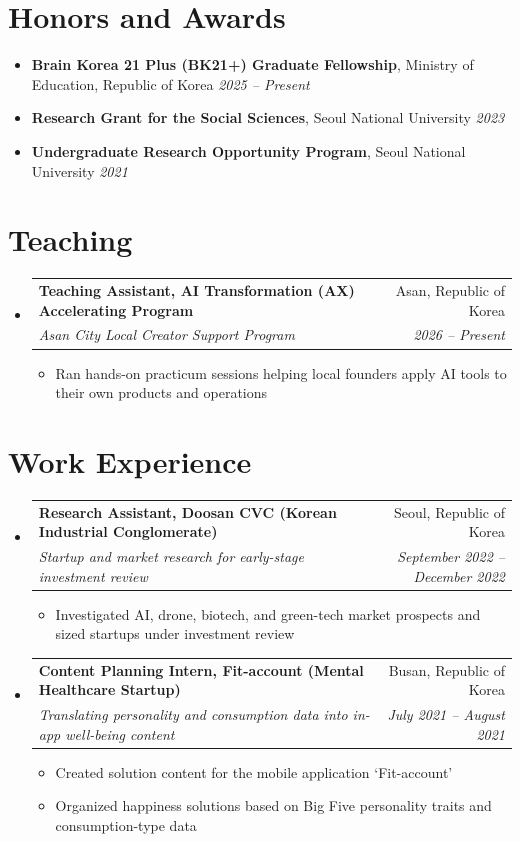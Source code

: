 \documentclass[letterpaper,10pt]{article}
\makeatletter
\newcommand{\ENTRYSEP}{0.4em}\newcommand{\PLAINSEP}{0.3em}
\newcommand{\DETSEP}{0.14em}\newcommand{\TOPSEP}{0.35em}
\newcommand{\ENTRYDROP}{-0.15em}
\newcommand{\ENTRYSEP}{0.18em}\newcommand{\PLAINSEP}{0.15em}
\newcommand{\DETSEP}{0.06em}\newcommand{\TOPSEP}{0.18em}
\newcommand{\ENTRYDROP}{-0.35em}
\let\oldsection\section
\renewcommand{\section}[1]{\needspace{8\baselineskip}\oldsection{#1}}
\newcommand{\entry}[4]{%
  \needspace{3.2\baselineskip}\item
  \begin{tabularx}{\linewidth}[t]{@{}>{\raggedright\arraybackslash}X@{\hspace{1.2em}}r@{}}
    \textbf{#1} & #2 \\[0.05em]
    \textit{\small #3} & \textit{\small #4} \\
  \end{tabularx}\vspace{\ENTRYDROP}%
}
\newenvironment{entries}
  {\begin{itemize}[leftmargin=1.2em, itemsep=\ENTRYSEP, parsep=0pt, topsep=\TOPSEP]}
  {\end{itemize}}
\newenvironment{details}
  {\begin{itemize}[label=$\circ$, leftmargin=1.4em, itemsep=\DETSEP, parsep=0pt, topsep=\TOPSEP]}
  {\end{itemize}\vspace{-0.2em}}
\newenvironment{plain}
  {\begin{itemize}[leftmargin=1.2em, itemsep=\PLAINSEP, parsep=0pt, topsep=\TOPSEP]}
  {\end{itemize}}
\makeatother
\begin{document}
\section{Honors and Awards}
\begin{plain}
  \item \textbf{Brain Korea 21 Plus (BK21+) Graduate Fellowship}, Ministry of Education,
        Republic of Korea \hfill \textit{\small 2025 -- Present}
  \item \textbf{Research Grant for the Social Sciences}, Seoul National University
        \hfill \textit{\small 2023}
  \item \textbf{Undergraduate Research Opportunity Program}, Seoul National University
        \hfill \textit{\small 2021}
\end{plain}

\section{Teaching}
\begin{entries}
  \entry{Teaching Assistant, AI Transformation (AX) Accelerating Program}{Asan, Republic of Korea}
        {Asan City Local Creator Support Program}{2026 -- Present}
  \begin{details}
    \item Ran hands-on practicum sessions helping local founders apply AI tools to their own
          products and operations
  \end{details}
\end{entries}

\section{Work Experience}
\begin{entries}
  \entry{Research Assistant, Doosan CVC (Korean Industrial Conglomerate)}{Seoul, Republic of Korea}
        {Startup and market research for early-stage investment review}{September 2022 -- December 2022}
  \begin{details}
    \item Investigated AI, drone, biotech, and green-tech market prospects and sized startups
          under investment review
  \end{details}

  \entry{Content Planning Intern, Fit-account (Mental Healthcare Startup)}{Busan, Republic of Korea}
        {Translating personality and consumption data into in-app well-being content}{July 2021 -- August 2021}
  \begin{details}
    \item Created solution content for the mobile application `Fit-account'
    \item Organized happiness solutions based on Big Five personality traits and
          consumption-type data
  \end{details}
\end{entries}
\end{document}
